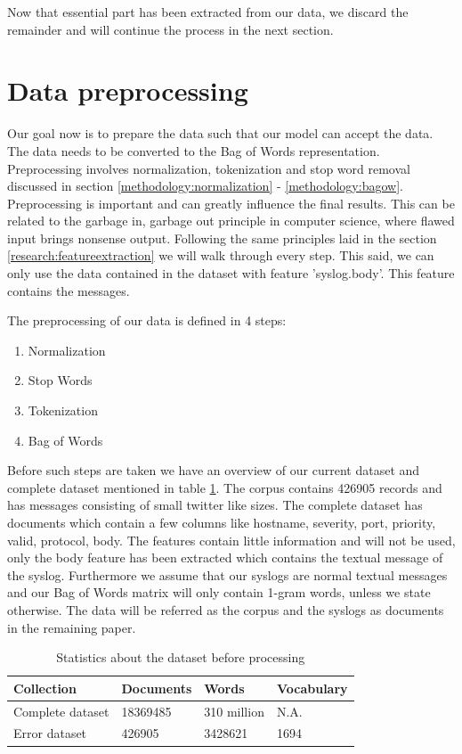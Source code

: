 Now that essential part has been extracted from our data, we discard the remainder and will continue the process in the next section. 


\section{Data preprocessing}\label{methodology:Text preprocessing}
Our goal now is to prepare the data such that our model can accept the data. The data needs to be converted to the Bag of Words representation. Preprocessing involves normalization, tokenization and stop word removal discussed in section \ref{methodology:normalization} - \ref{methodology:bagow}. Preprocessing is important and can greatly influence the final results. This can be related to the garbage in, garbage out principle in computer science, where flawed input brings nonsense output. Following the same principles laid in the section \ref{research:featureextraction} we will walk through every step. This said, we can only use the data contained in the dataset with feature 'syslog.body'. This feature contains the messages. 

The preprocessing of our data is defined in 4 steps:
\begin{enumerate}
    \item Normalization
    \item Stop Words
    \item Tokenization
    \item Bag of Words
\end{enumerate}

Before such steps are taken we have an overview of our current dataset and complete dataset mentioned in table \ref{tab:tablestatistics}. The corpus contains 426905 records and has messages consisting of small twitter like sizes. The complete dataset has documents which contain a few columns like hostname, severity, port, priority, valid, protocol, body. The features contain little information and will not be used, only the body feature has been extracted which contains the textual message of the syslog. Furthermore we assume that our syslogs are normal textual messages and our Bag of Words matrix will only contain 1-gram words, unless we state otherwise.  
The data will be referred as the corpus and the syslogs as documents in the remaining paper. 


\begin{table}[h]
\centering
 \begin{tabular}{|l|l|l|l|} 
 \hline
 Collection & Documents & Words & Vocabulary  \\ [0.5ex] 
 \hline\hline
 Complete dataset & 18369485 & 310 million & N.A.  \\ 
 Error dataset & 426905 & 3428621 & 1694 \\
 \hline
 \end{tabular}
\caption{Statistics about the dataset before processing}
\label{tab:tablestatistics}
\end{table}

